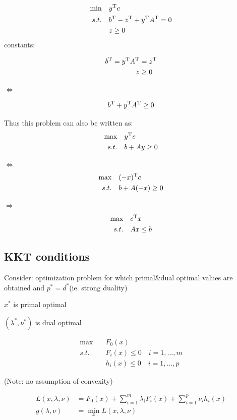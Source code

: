 \begin{align*}
\min\quad &y^{{\rm T}}c\\
s.t.\quad &b^{{\rm T}}-z^{{\rm T}}+y^{{\rm T}}A^{{\rm T}}=0\\
&z\geq 0
\end{align*}
constants:


\begin{align*}
b^{{\rm T}}=y^{{\rm T}}A^{{\rm T}} &= z^{{\rm T}}\\
z&\geq 0
\end{align*}

$\Leftrightarrow$

\begin{equation*}
b^{{\rm T}}+y^{{\rm T}}A^{{\rm T}} \geq 0
\end{equation*}

Thus this problem can also be written as:
\begin{align*}
\max\quad &y^{{\rm T}}c\\
s.t.\quad &b+Ay \geq 0
\end{align*}

$\Leftrightarrow$
\begin{align*}
\max\quad &(-x)^{{\rm T}}c\\
s.t.\quad &b+A(-x) \geq 0
\end{align*}

$\Rightarrow$
\begin{align*}
\max\quad &c^{{\rm T}}x\\
s.t.\quad &Ax \leq b
\end{align*}


\subsection{KKT conditions}
Consider: optimization problem for which primal\&dual optimal values are obtained and $p^*=d^*$(ie. strong duality)

$x^*$ is primal optimal

$(\lambda^*,\nu^*)$ is dual optimal


\begin{align*}
\max\quad &F_0(x)\\
s.t.\quad &F_i(x)\leq 0\quad i = 1,...,m\\
&h_i(x)\leq 0\quad i = 1,...,p
\end{align*}

(Note: no assumption of convexity)


\begin{align*}
L(x,\lambda,\nu) &= F_0(x)+\sum^m_{i=1}\lambda_iF_i(x) + \sum^p_{i=1}\nu_ih_i(x)\\
g(\lambda,\nu)&= \min_xL(x,\lambda,\nu)
\end{align*}

